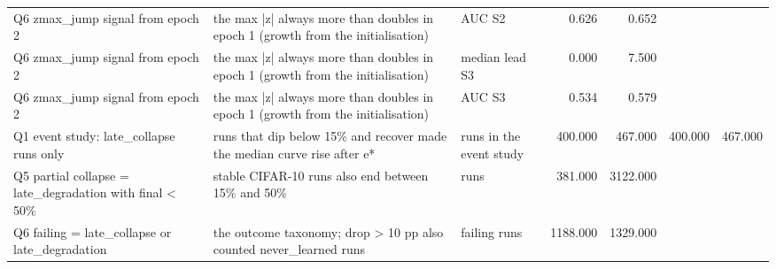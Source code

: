 \begin{table}[htbp]
{\begin{tabular}{@{}lllrrrr@{}}
Q6 zmax\_jump signal from epoch 2 & the max |z| always more than doubles in epoch 1 (growth from the initialisation) & AUC S2 & 0.626 & 0.652 &  &  \\
Q6 zmax\_jump signal from epoch 2 & the max |z| always more than doubles in epoch 1 (growth from the initialisation) & median lead S3 & 0.000 & 7.500 &  &  \\
Q6 zmax\_jump signal from epoch 2 & the max |z| always more than doubles in epoch 1 (growth from the initialisation) & AUC S3 & 0.534 & 0.579 &  &  \\
Q1 event study: late\_collapse runs only & runs that dip below 15\% and recover made the median curve rise after e* & runs in the event study & 400.000 & 467.000 & 400.000 & 467.000 \\
Q5 partial collapse = late\_degradation with final < 50\% & stable CIFAR-10 runs also end between 15\% and 50\% & runs & 381.000 & 3122.000 &  &  \\
Q6 failing = late\_collapse or late\_degradation & the outcome taxonomy; drop > 10 pp also counted never\_learned runs & failing runs & 1188.000 & 1329.000 &  &  \\
\bottomrule
\end{tabular}}
\end{table}
